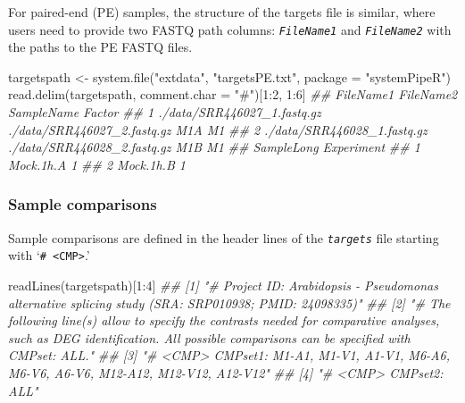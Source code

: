 \documentclass[14pt,]{article}
\newcommand{\hlnum}[1]{\textcolor[rgb]{0.816,0.125,0.439}{#1}}%
\newcommand{\hlstr}[1]{\textcolor[rgb]{0.251,0.627,0.251}{#1}}%
\newcommand{\hlcom}[1]{\textcolor[rgb]{0.502,0.502,0.502}{\textit{#1}}}%
\newcommand{\hlstd}[1]{\textcolor[rgb]{0.251,0.251,0.251}{#1}}%
\newenvironment{Shaded}{\begin{myshaded}}{\end{myshaded}}
\newcommand{\DecValTok}[1]{\hlnum{#1}}
\newcommand{\SpecialCharTok}[1]{\hlstr{#1}}
\newcommand{\StringTok}[1]{\hlstr{#1}}
\newcommand{\DocumentationTok}[1]{\hlcom{#1}}
\newcommand{\OtherTok}[1]{{#1}}
\newcommand{\FunctionTok}[1]{\hlstd{#1}}
\newcommand{\AttributeTok}[1]{{#1}}
\newcommand{\NormalTok}[1]{\hlstd{#1}}
\begin{document}
For paired-end (PE) samples, the structure of the targets file is similar, where
users need to provide two FASTQ path columns: \emph{\texttt{FileName1}} and \emph{\texttt{FileName2}}
with the paths to the PE FASTQ files.

\begin{Shaded}
\begin{Highlighting}[]
\NormalTok{targetspath }\OtherTok{\textless{}{-}} \FunctionTok{system.file}\NormalTok{(}\StringTok{"extdata"}\NormalTok{, }\StringTok{"targetsPE.txt"}\NormalTok{, }\AttributeTok{package =} \StringTok{"systemPipeR"}\NormalTok{)}
\FunctionTok{read.delim}\NormalTok{(targetspath, }\AttributeTok{comment.char =} \StringTok{"\#"}\NormalTok{)[}\DecValTok{1}\SpecialCharTok{:}\DecValTok{2}\NormalTok{, }\DecValTok{1}\SpecialCharTok{:}\DecValTok{6}\NormalTok{]}
\DocumentationTok{\#\#                     FileName1                   FileName2 SampleName Factor}
\DocumentationTok{\#\# 1 ./data/SRR446027\_1.fastq.gz ./data/SRR446027\_2.fastq.gz        M1A     M1}
\DocumentationTok{\#\# 2 ./data/SRR446028\_1.fastq.gz ./data/SRR446028\_2.fastq.gz        M1B     M1}
\DocumentationTok{\#\#   SampleLong Experiment}
\DocumentationTok{\#\# 1  Mock.1h.A          1}
\DocumentationTok{\#\# 2  Mock.1h.B          1}
\end{Highlighting}
\end{Shaded}

\hypertarget{sample-comparisons}{%
\subsubsection{Sample comparisons}\label{sample-comparisons}}

Sample comparisons are defined in the header lines of the \emph{\texttt{targets}} file
starting with `\texttt{\# \textless{}CMP\textgreater{}}.'

\begin{Shaded}
\begin{Highlighting}[]
\FunctionTok{readLines}\NormalTok{(targetspath)[}\DecValTok{1}\SpecialCharTok{:}\DecValTok{4}\NormalTok{]}
\DocumentationTok{\#\# [1] "\# Project ID: Arabidopsis {-} Pseudomonas alternative splicing study (SRA: SRP010938; PMID: 24098335)"                                                                              }
\DocumentationTok{\#\# [2] "\# The following line(s) allow to specify the contrasts needed for comparative analyses, such as DEG identification. All possible comparisons can be specified with \textquotesingle{}CMPset: ALL\textquotesingle{}."}
\DocumentationTok{\#\# [3] "\# \textless{}CMP\textgreater{} CMPset1: M1{-}A1, M1{-}V1, A1{-}V1, M6{-}A6, M6{-}V6, A6{-}V6, M12{-}A12, M12{-}V12, A12{-}V12"                                                                                             }
\DocumentationTok{\#\# [4] "\# \textless{}CMP\textgreater{} CMPset2: ALL"}
\end{Highlighting}
\end{Shaded}
\end{document}
